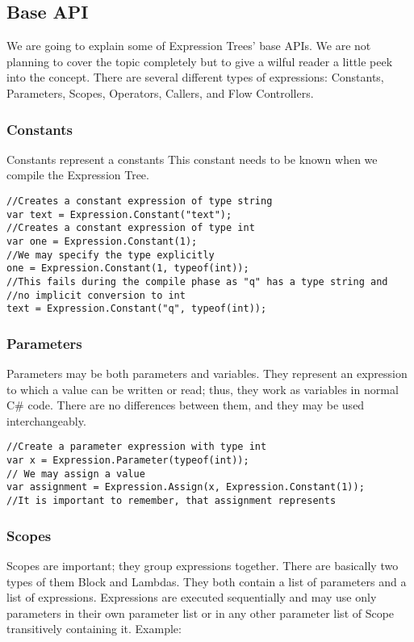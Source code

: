 \subsection{Base API}
We are going to explain some of Expression Trees' base APIs. We are not planning to cover the topic completely but to give a wilful reader a little peek into the concept.
There are several different types of expressions: Constants, Parameters, Scopes, Operators, Callers, and Flow Controllers.

\subsubsection{Constants}
Constants represent a constants This constant needs to be known when we compile the Expression Tree.
\begin{lstlisting}
//Creates a constant expression of type string
var text = Expression.Constant("text");
//Creates a constant expression of type int
var one = Expression.Constant(1);
//We may specify the type explicitly
one = Expression.Constant(1, typeof(int));
//This fails during the compile phase as "q" has a type string and
//no implicit conversion to int
text = Expression.Constant("q", typeof(int));
\end{lstlisting}

\subsubsection{Parameters}
Parameters may be both parameters and variables. They represent an expression to which a value can be written or read; thus, they work as variables in normal C\# code. There are no differences between them, and they may be used interchangeably. 
\begin{lstlisting}
//Create a parameter expression with type int
var x = Expression.Parameter(typeof(int));
// We may assign a value
var assignment = Expression.Assign(x, Expression.Constant(1));
//It is important to remember, that assignment represents
\end{lstlisting}

\subsubsection{Scopes}
Scopes are important; they group expressions together. There are basically two types of them Block and Lambdas. They both contain a list of parameters and a list of expressions. Expressions are executed sequentially and may use only parameters in their own parameter list or in any other parameter list of Scope transitively containing it. Example:

